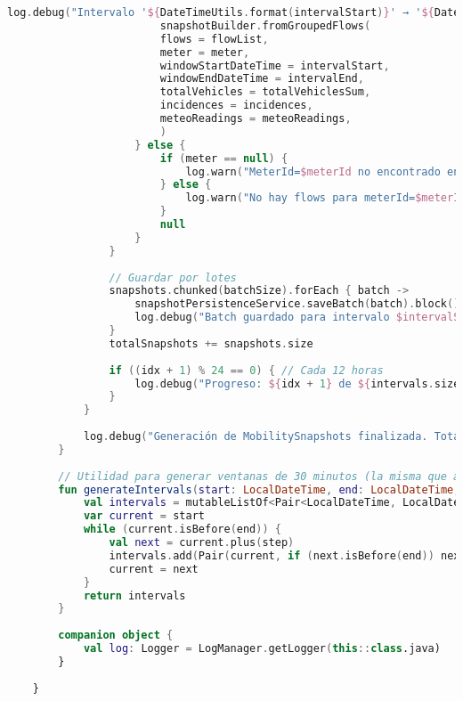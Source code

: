 \begin{lstlisting}[language=Kotlin, caption={Clase MobilitySnapshotGeneratorService}]
						log.debug("Intervalo '${DateTimeUtils.format(intervalStart)}' → '${DateTimeUtils.format(intervalEnd)}' | meterId=$meterId | numFlows=${flowList.size} | totalVehiclesSum=$totalVehiclesSum | totalIncidences=${incidences.size} |meteoReadings=${meteoReadings.size}")
						snapshotBuilder.fromGroupedFlows(
						flows = flowList,
						meter = meter,
						windowStartDateTime = intervalStart,
						windowEndDateTime = intervalEnd,
						totalVehicles = totalVehiclesSum,
						incidences = incidences,
						meteoReadings = meteoReadings,
						)
					} else {
						if (meter == null) {
							log.warn("MeterId=$meterId no encontrado en meterMap para ventana '${DateTimeUtils.format(intervalStart)}' → '${DateTimeUtils.format(intervalEnd)}'")
						} else {
							log.warn("No hay flows para meterId=$meterId en ventana '${DateTimeUtils.format(intervalStart)}' → '${DateTimeUtils.format(intervalEnd)}'")
						}
						null
					}
				}
				
				// Guardar por lotes
				snapshots.chunked(batchSize).forEach { batch ->
					snapshotPersistenceService.saveBatch(batch).block()
					log.debug("Batch guardado para intervalo $intervalStart → $intervalEnd (${batch.size} snapshots)")
				}
				totalSnapshots += snapshots.size
				
				if ((idx + 1) % 24 == 0) { // Cada 12 horas
					log.debug("Progreso: ${idx + 1} de ${intervals.size} intervalos procesados, $totalSnapshots snapshots generados.")
				}
			}
			
			log.debug("Generación de MobilitySnapshots finalizada. Total snapshots: $totalSnapshots")
		}
		
		// Utilidad para generar ventanas de 30 minutos (la misma que antes)
		fun generateIntervals(start: LocalDateTime, end: LocalDateTime, step: Duration): List<Pair<LocalDateTime, LocalDateTime>> {
			val intervals = mutableListOf<Pair<LocalDateTime, LocalDateTime>>()
			var current = start
			while (current.isBefore(end)) {
				val next = current.plus(step)
				intervals.add(Pair(current, if (next.isBefore(end)) next else end))
				current = next
			}
			return intervals
		}
		
		companion object {
			val log: Logger = LogManager.getLogger(this::class.java)
		}
		
	}
\end{lstlisting}